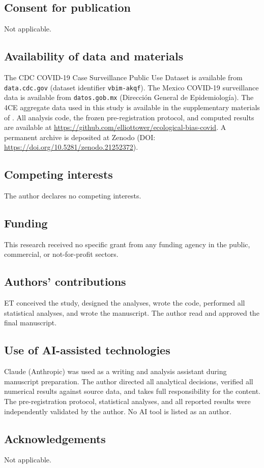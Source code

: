 \documentclass[11pt]{article}
\begin{document}
\subsection*{Consent for publication}
Not applicable.

\subsection*{Availability of data and materials}
The CDC COVID-19 Case Surveillance Public Use Dataset is available from
\texttt{data.cdc.gov} (dataset identifier \texttt{vbim-akqf}).  The
Mexico COVID-19 surveillance data is available from \texttt{datos.gob.mx}
(Direcci\'{o}n General de Epidemiolog\'{i}a).  The 4CE aggregate data
used in this study is available in the supplementary materials of
\citet{four_ce_neuro2021}.  All analysis code, the frozen
pre-registration protocol, and computed results are available at
\url{https://github.com/elliottower/ecological-bias-covid}.
A permanent archive is deposited at Zenodo
(DOI: \url{https://doi.org/10.5281/zenodo.21252372}).

\subsection*{Competing interests}
The author declares no competing interests.

\subsection*{Funding}
This research received no specific grant from any funding agency in the
public, commercial, or not-for-profit sectors.

\subsection*{Authors' contributions}
ET conceived the study, designed the analyses, wrote the code, performed
all statistical analyses, and wrote the manuscript.  The author read and
approved the final manuscript.

\subsection*{Use of AI-assisted technologies}
Claude (Anthropic) was used as a writing and analysis assistant during
manuscript preparation.  The author directed all analytical decisions,
verified all numerical results against source data, and takes full
responsibility for the content.  The pre-registration protocol,
statistical analyses, and all reported results were independently
validated by the author.  No AI tool is listed as an author.

\subsection*{Acknowledgements}
Not applicable.



\end{document}
